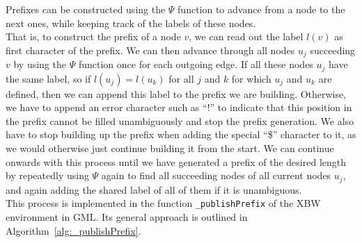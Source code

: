 \documentclass[a4paper,12pt,twoside,BCOR=10mm]{scrbook}
\begin{document}
Prefixes can be constructed using the $ \Psi $ function to advance from a node to the next ones,
while keeping track of the labels of these nodes. \\
That is, to construct the prefix of a node $ v $, we can read out the label $ l ( v ) $ as
first character of the prefix.
We can then advance through all nodes $ u_j $ succeeding $ v $ by using the $ \Psi $ function once
for each outgoing edge.
If all these nodes $ u_j $ have the same label, so if $ l ( u_j ) = l ( u_k ) $ for
all $ j $ and $ k $ for which $ u_j $ and $ u_k $ are defined, then we can append this label
to the prefix we are building.
Otherwise, we have to append an error character such as “!” to indicate that this position in the
prefix cannot be filled unambiguously and stop the prefix generation.
We also have to stop building up the prefix when adding the special “\$” character to it,
as we would otherwise just continue building it from the start.
We can continue onwards with this process until we have generated a prefix of the desired length
by repeatedly using $ \Psi $ again to find all succeeding nodes
of all current nodes $ u_j $, and again adding the shared label of all of them if it is unambiguous. \\
This process is implemented in the function \texttt{\_publishPrefix} of the XBW environment in GML.
Its general approach is outlined in Algorithm~\ref{alg:_publishPrefix}.
\end{document}
